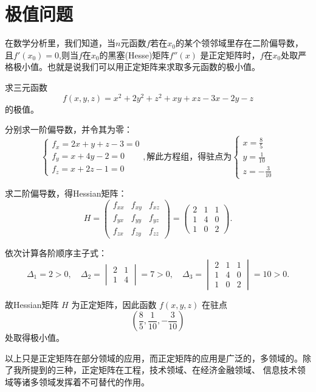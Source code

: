 \section{极值问题}
在数学分析里，我们知道，当$n$元函数$f$若在$x_0$的某个领邻域里存在二阶偏导数，且$f'(x_0)=0$,则当$f$在$x_0$的黑塞(Hesse)矩阵$f''(x)$
是正定矩阵时，$f$在$x_0$处取严格极小值。也就是说我们可以用正定矩阵来求取多元函数的极小值。 
\begin{example}
    求三元函数
\[
f(x,y,z)=x^2 + 2y^2 + z^2 + xy + xz - 3x - 2y - z
\]
的极值。
\end{example}
\begin{solution}

分别求一阶偏导数，并令其为零：
\[
\begin{cases}
f_x = 2x + y + z - 3 = 0\\
f_y = x + 4y - 2 = 0\\
f_z = x + 2z - 1 = 0
\end{cases},\text{解此方程组，得驻点为}
\begin{cases}
    x=\frac{8}{5}\\ y=\frac{1}{10}\\z=-\frac{3}{10}
\end{cases}
\]

求二阶偏导数，得Hessian矩阵：
\[
H =
\begin{pmatrix}
f_{xx} & f_{xy} & f_{xz}\\
f_{yx} & f_{yy} & f_{yz}\\
f_{zx} & f_{zy} & f_{zz}
\end{pmatrix}
=
\begin{pmatrix}
2 & 1 & 1\\
1 & 4 & 0\\
1 & 0 & 2
\end{pmatrix}.
\]

依次计算各阶顺序主子式：
\[
\Delta_1 = 2 > 0,\quad
\Delta_2 = \begin{vmatrix}2 & 1\\1 & 4\end{vmatrix} = 7 > 0,\quad
\Delta_3 = \begin{vmatrix}2 & 1 & 1\\1 & 4 & 0\\1 & 0 & 2\end{vmatrix} = 10 > 0.
\]

故Hessian矩阵 $H$ 为正定矩阵，因此函数 $f(x,y,z)$ 在驻点
\[
\left(\frac{8}{5},\frac{1}{10},-\frac{3}{10}\right)
\]
处取得极小值。
\end{solution}

以上只是正定矩阵在部分领域的应用，而正定矩阵的应用是广泛的，多领域的。除了我所提到的三种，正定矩阵在工程，技术领域、在经济金融领域、
信息技术领域等诸多领域发挥着不可替代的作用。